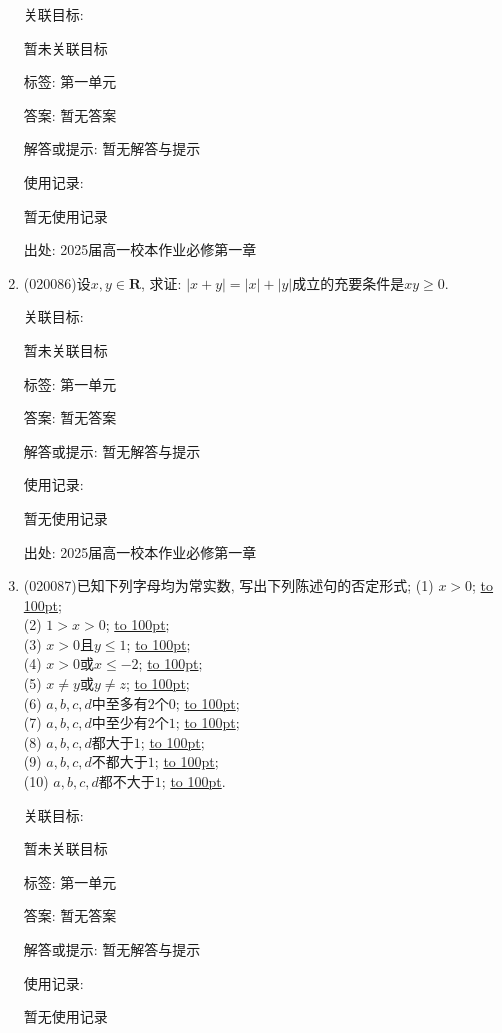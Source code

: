 \documentclass[10pt,a4paper]{article}
\newcommand{\blank}[1]{\underline{\hbox to #1pt{}}}
\begin{document}
\begin{enumerate}[1.]
关联目标:

暂未关联目标



标签: 第一单元

答案: 暂无答案

解答或提示: 暂无解答与提示

使用记录:

暂无使用记录


出处: 2025届高一校本作业必修第一章
\item { (020086)}设$x,y\in \mathbf{R}$, 求证: $|x+y|=|x|+|y|$成立的充要条件是$xy\ge 0$.


关联目标:

暂未关联目标



标签: 第一单元

答案: 暂无答案

解答或提示: 暂无解答与提示

使用记录:

暂无使用记录


出处: 2025届高一校本作业必修第一章
\item { (020087)}已知下列字母均为常实数, 写出下列陈述句的否定形式;
(1) $x>0$; \blank{100};\\
(2) $1>x>0$; \blank{100};\\
(3) $x>0$且$y\le 1$; \blank{100};\\
(4) $x>0$或$x\le -2$; \blank{100};\\
(5) $x\ne y$或$y\ne z$; \blank{100};\\
(6) $a,b,c,d$中至多有$2$个$0$; \blank{100};\\
(7) $a,b,c,d$中至少有$2$个$1$; \blank{100};\\
(8) $a,b,c,d$都大于$1$; \blank{100};\\
(9) $a,b,c,d$不都大于$1$; \blank{100};\\
(10) $a,b,c,d$都不大于$1$; \blank{100}.


关联目标:

暂未关联目标



标签: 第一单元

答案: 暂无答案

解答或提示: 暂无解答与提示

使用记录:

暂无使用记录



\end{enumerate}
\end{document}
